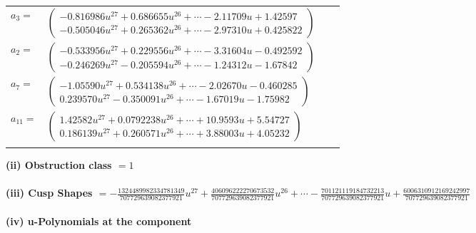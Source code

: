 \documentclass[1p]{elsarticle_modified}
\theoremstyle{definition}
\begin{document}
\begin{tabular}{m{7pt} m{180pt} m{7pt} m{180pt} }
\flushright $a_{3}=$&$\begin{pmatrix}-0.816986 u^{27}+0.686655 u^{26}+\cdots-2.11709 u+1.42597\\-0.505046 u^{27}+0.265362 u^{26}+\cdots-2.97310 u+0.425822\end{pmatrix}$ \\
\flushright $a_{2}=$&$\begin{pmatrix}-0.533956 u^{27}+0.229556 u^{26}+\cdots-3.31604 u-0.492592\\-0.246269 u^{27}-0.205594 u^{26}+\cdots-1.24312 u-1.67842\end{pmatrix}$ \\
\flushright $a_{7}=$&$\begin{pmatrix}-1.05590 u^{27}+0.534138 u^{26}+\cdots-2.02670 u-0.460285\\0.239570 u^{27}-0.350091 u^{26}+\cdots-1.67019 u-1.75982\end{pmatrix}$ \\
\flushright $a_{11}=$&$\begin{pmatrix}1.42582 u^{27}+0.0792238 u^{26}+\cdots+10.9593 u+5.54727\\0.186139 u^{27}+0.260571 u^{26}+\cdots+3.88003 u+4.05232\end{pmatrix}$\\&\end{tabular}
\flushleft \textbf{(ii) Obstruction class $= 1$}\\~\\
\flushleft \textbf{(iii) Cusp Shapes $= -\frac{1324489982334781349}{707729639082377921} u^{27}+\frac{406096222270673532}{707729639082377921} u^{26}+\cdots-\frac{701121119184732213}{707729639082377921} u+\frac{6006310912169242997}{707729639082377921}$}\\~\\
\newpage\renewcommand{\arraystretch}{1}
\flushleft \textbf{(iv) u-Polynomials at the component}\newline \\
\end{document}
